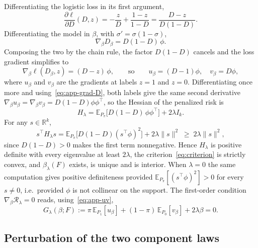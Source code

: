 \documentclass[11pt]{article}
\theoremstyle{plain}
\theoremstyle{definition}
\theoremstyle{remark}
\newcommand{\pE}{\ensuremath{\mathbb{E}}}
\newcommand{\R}{\mathbb{R}}
\newcommand{\cR}{\ensuremath{\mathcal{R}}}
\newcommand{\ratio}{\ensuremath{\pi}}
\newcommand{\ks}{k}
\begin{document}
Differentiating the logistic loss in its first argument,
\begin{equation}
\frac{\partial \ell}{\partial D}(D,z)
= -\frac{z}{D} + \frac{1-z}{1-D}
= \frac{D-z}{D(1-D)} .
\label{eq:app-dl}
\end{equation}
Differentiating the model in $\beta$, with $\sigma' = \sigma(1-\sigma)$,
\begin{equation}
\nabla_\beta D_\beta = D(1-D)\,\phi .
\label{eq:app-grad-D}
\end{equation}
Composing the two by the chain rule, the factor $D(1-D)$ cancels and the loss gradient
simplifies to
\begin{equation}
\nabla_\beta \ell(D_\beta,z) = (D-z)\,\phi ,
\qquad\text{so}\qquad
u_\beta = (D-1)\phi, \quad v_\beta = D\phi ,
\label{eq:app-uv}
\end{equation}
where $u_\beta$ and $v_\beta$ are the gradients at labels $z=1$ and $z=0$. Differentiating once
more and using~\eqref{eq:app-grad-D}, both labels give the same second derivative
$\nabla_\beta u_\beta = \nabla_\beta v_\beta = D(1-D)\phi\phi^\top$, so the Hessian of the
penalized risk is
\begin{equation}
H_\lambda
= \pE_{P_\ratio}\big[ D(1-D)\,\phi\phi^\top \big] + 2\lambda I_{\ks} .
\label{eq:app-hessian}
\end{equation}
For any $s \in \R^{\ks}$,
\[
s^\top H_\lambda s
= \pE_{P_\ratio}\big[ D(1-D)(s^\top\phi)^2 \big] + 2\lambda\|s\|^2
\;\ge\; 2\lambda\|s\|^2 ,
\]
since $D(1-D) > 0$ makes the first term nonnegative. Hence $H_\lambda$ is positive definite with
every eigenvalue at least $2\lambda$, the criterion~\eqref{eq:criterion} is strictly convex, and
$\beta_\lambda(F)$ exists, is unique and is interior. When $\lambda = 0$ the same computation
gives positive definiteness provided $\pE_{P_\ratio}[(s^\top\phi)^2] > 0$ for every $s \neq 0$,
i.e.\ provided $\phi$ is not collinear on the support. The first-order condition
$\nabla_\beta \cR_\lambda = 0$ reads, using~\eqref{eq:app-uv},
\begin{equation}
G_\lambda(\beta;F)
:= \ratio\,\pE_{P_1}[u_\beta] + (1-\ratio)\,\pE_{P_0}[v_\beta] + 2\lambda\beta = 0 .
\label{eq:app-foc}
\end{equation}

\subsection{Perturbation of the two component laws}
\label{app:logistic-channels}
\end{document}
